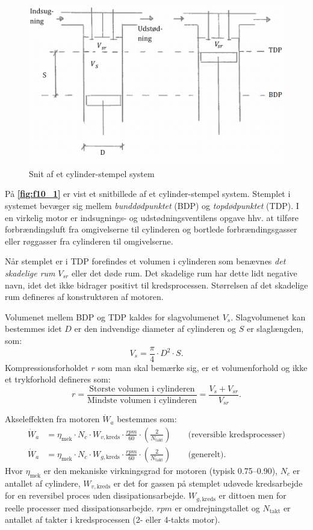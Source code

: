 \begin{figure} [ht]
  \centering
  \includegraphics[width=0.5\linewidth]{./figures/f10_1.png}
  \caption{Snit af et cylinder-stempel system}
  \label{fig:f10_1}
\end{figure}

På \textbf{\autoref{fig:f10_1}} er vist et snitbillede af et cylinder-stempel system. Stemplet i systemet bevæger sig mellem \textit{bunddødpunktet} (BDP) og \textit{topdødpunktet} (TDP). I en virkelig motor er indsugnings- og udstødningsventilens opgave hhv. at tilføre forbrændingsluft fra omgivelserne til cylinderen og bortlede forbrændingsgasser eller røggasser fra cylinderen til omgivelserne.

Når stemplet er i TDP forefindes et volumen i cylinderen som benævnes \textit{det skadelige rum} $V_{s r}$ eller det døde rum. Det skadelige rum har dette lidt negative navn, idet det ikke bidrager positivt til kredsprocessen. Størrelsen af det skadelige rum defineres af konstruktøren af motoren.

Volumenet mellem BDP og TDP kaldes for slagvolumenet $V_s$. Slagvolumenet kan bestemmes idet $D$ er den indvendige diameter af cylinderen og $S$ er slaglængden, som:
\[ 
V_s = \frac{\pi}{4} \cdot D^2 \cdot S
.\]
Kompressionsforholdet $r$ som man skal bemærke sig, er et volumenforhold og ikke et trykforhold defineres som:
\[ 
r = \frac{\text{Største volumen i cylinderen}}{\text{Mindste volumen i cylinderen}} = \frac{V_s + V_{sr}}{V_{s r}}
.\]

Akseleffekten fra motoren $\dot{W}_a$ bestemmes som:
\begin{align*}
  \dot{W}_a &= \eta_{\mathrm{mek}} \cdot N_c \cdot W_{v, \mathrm{kreds}} \cdot \frac{\unit{rpm}}{60} \cdot \left( \frac{2}{N_{\mathrm{takt}}} \right) \qquad \text{(reversible kredsprocesser)} \\
  \dot{W}_a &= \eta_{\mathrm{mek}} \cdot N_c \cdot W_{g, \mathrm{kreds}} \cdot \frac{\unit{rpm}}{60} \cdot \left( \frac{2}{N_{\mathrm{takt}}} \right) \qquad \text{(generelt)}
.\end{align*}
Hvor $\eta_{\mathrm{mek}}$ er den mekaniske virkningsgrad for motoren (typisk \num{0,75}--\num{0,90}), $N_c$ er antallet af cylindere, $W_{v, \mathrm{kreds}}$ er det for gassen på stemplet udøvede kredsarbejde for en reversibel proces uden dissipationsarbejde. $W_{g, \mathrm{kreds}}$ er dittoen men for reelle processer med dissipationsarbejde. $\unit{rpm}$ er omdrejningstallet og $N_{\mathrm{takt}}$ er antallet af takter i kredsprocessen (2- eller 4-takts motor).

